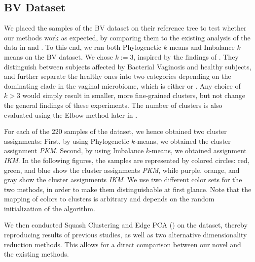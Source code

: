 \subsection{BV Dataset}
\label{ch:Clustering:sec:Results:sub:BVDataset}

We placed the samples of the \ac{BV} dataset \cite{Srinivasan2012} on their reference tree
to test whether our methods work as expected,
by comparing them to the existing analysis of the data in \cite{Srinivasan2012} and \cite{Matsen2011a}.
To this end, we ran both Phylogenetic $k$-means and Imbalance $k$-means on the \ac{BV} dataset.
We chose $k:=3$, inspired by the findings of \cite{Srinivasan2012}.
They distinguish between subjects affected by Bacterial Vaginosis and healthy subjects,
and further separate the healthy ones into two categories depending on the dominating clade in the vaginal microbiome,
which is either  or .
Any choice of $k > 3$ would simply result in smaller, more fine-grained clusters,
but not change the general findings of these experiments.
The number of clusters is also evaluated using the Elbow method later in .

For each of the \num{220} samples of the dataset, we hence obtained two cluster assignments:
First, by using Phylogenetic $k$-means, we obtained the cluster assignment \emph{PKM}.
Second, by using Imbalance $k$-means, we obtained assignment \emph{IKM}.
In the following figures, the samples are represented by colored circles:
red, green, and blue show the cluster assignments \emph{PKM},
while purple, orange, and gray show the cluster assignments \emph{IKM}.
We use two different color sets for the two methods, in order to make them distinguishable at first glance.
Note that the mapping of colors to clusters is arbitrary and depends on the random initialization of the algorithm.

We then conducted Squash Clustering and Edge PCA ()
on the dataset, thereby reproducing results of previous studies,
as well as two alternative dimensionality reduction methods.
This allows for a direct comparison between our novel and the existing methods.


